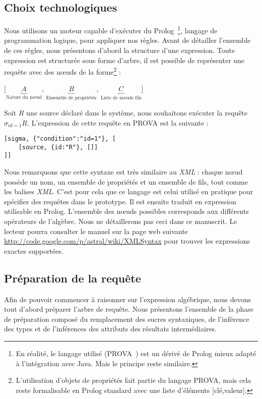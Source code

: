 \subsection{Choix technologiques}
Nous utilisons un moteur capable d'exécuter du Prolog~\footnote{En réalité, le langage utilisé (PROVA~\cite{Kozlenkov:prova}) est un dérivé de Prolog mieux adapté à l'intégration avec Java. Mais le principe reste similaire.}, langage de programmation logique, pour appliquer nos règles. Avant de détailler l'ensemble de ces règles, nous présentons d'abord la structure d'une expression. Toute expression est structurée sous forme d'arbre, il est possible de représenter une requête avec des nœuds de la forme\footnote{L'utilisation d'objets de propriétés fait partie du langage PROVA, mais cela reste formalisable en Prolog standard avec une liste d'éléments [clé,valeur].} :
\begin{center} [$\underbrace{A}_{\textrm{Nature du nœud}}$, $\underbrace{B}_{\textrm{Ensemble de propriétés}}$, $\underbrace{C}_{\textrm{Liste de nœuds fils}}$] \end{center}
\begin{example}
	Soit $R$ une source déclaré dans le système, nous souhaitons exécuter la requête $\sigma_{id=1} R$. L'expression de cette requête en PROVA est la suivante :
	\begin{lstlisting}
[sigma,	{"condition":"id=1"}, [
	[source, {id:"R"}, []]
]]
	\end{lstlisting}
\end{example}
Nous remarquons que cette syntaxe est très similaire au \textit{XML} : chaque nœud possède un nom, un ensemble de propriétés et un ensemble de fils, tout comme les balises \textit{XML}. C'est pour cela que ce langage est celui utilisé en pratique pour spécifier des requêtes dans le prototype. Il est ensuite traduit en expression utilisable en Prolog. L'ensemble des nœuds possibles corresponds aux différents opérateurs de l'algèbre. Nous ne détaillerons pas ceci dans ce manuscrit. Le lecteur pourra consulter le manuel sur la page web suivante \url{http://code.google.com/p/astral/wiki/XMLSyntax} pour trouver les expressions exactes supportées.


\subsection{Préparation de la requête}
Afin de pouvoir commencer à raisonner sur l'expression algébrique, nous devons tout d'abord préparer l'arbre de requête. Nous présentons l'ensemble de la phase de préparation composé du remplacement des sucres syntaxiques, de l'inférence des types et de l'inférences des attributs des résultats intermédiaires.
